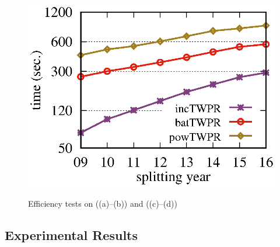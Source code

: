 \begin{figure}[tb!]
\begin{center}
{\includegraphics[scale=\graphscale]{./exp/MAG_time_twpr.eps}}
\hspace{0ex}
{}
\end{center}
\vspace{-2.5ex}
\caption{\small Efficiency tests on \aminer ((a)--(b)) and  \magdata ((c)--(d))}
\label{exp-time}
\vspace{-2ex}
\end{figure}

\subsection{Experimental Results}
\label{subsec-expres}

